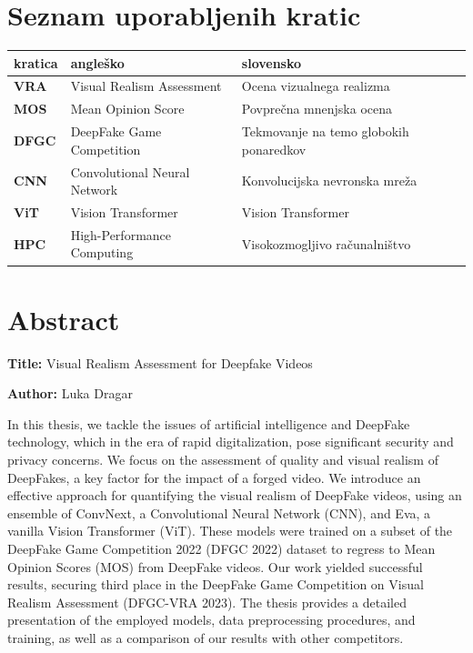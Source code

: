 \documentclass[a4paper,12pt,openright]{book}
\newcommand{\ttitleEn}{Visual Realism Assessment for Deepfake Videos}
\newcommand{\tauthor}{Luka Dragar}
\newcommand{\clearemptydoublepage}{\newpage{\pagestyle{empty}\cleardoublepage}}
\begin{document}
\clearemptydoublepage

\chapter*{Seznam uporabljenih kratic}

\noindent\begin{tabular}{p{}|p{}|p{}}
  {\bf kratica} & {\bf angleško}                              & {\bf slovensko} \\ \hline
  {\bf VRA}     & Visual Realism Assessment      & Ocena vizualnega realizma\\
  \hline
  {\bf MOS}     & Mean Opinion Score                           & Povprečna mnenjska ocena \\
  \hline
  {\bf DFGC}    & DeepFake Game Competition                & 
Tekmovanje na temo globokih ponaredkov \\
  \hline
  {\bf CNN}     & Convolutional Neural Network                 & Konvolucijska nevronska mreža \\
  \hline
  {\bf ViT}     & Vision Transformer                           & Vision Transformer \\
  \hline
  {\bf HPC}     & High-Performance Computing                   & Visokozmogljivo računalništvo \\
\end{tabular}



\clearemptydoublepage
{}
\chapter*{Abstract}

\noindent\textbf{Title:} \ttitleEn
\bigskip

\noindent\textbf{Author:} \tauthor
\bigskip

\noindent In this thesis, we tackle the issues of artificial intelligence and DeepFake technology, which in the era of rapid digitalization, pose significant security and privacy concerns. We focus on the assessment of quality and visual realism of DeepFakes, a key factor for the impact of a forged video. We introduce an effective approach for quantifying the visual realism of DeepFake videos, using an ensemble of ConvNext, a Convolutional Neural Network (CNN), and Eva, a vanilla Vision Transformer (ViT). These models were trained on a subset of the DeepFake Game Competition 2022 (DFGC 2022) dataset to regress to Mean Opinion Scores (MOS) from DeepFake videos. Our work yielded successful results, securing third place in the DeepFake Game Competition on Visual Realism Assessment (DFGC-VRA 2023). The thesis provides a detailed presentation of the employed models, data preprocessing procedures, and training, as well as a comparison of our results with other competitors.
\end{document}
